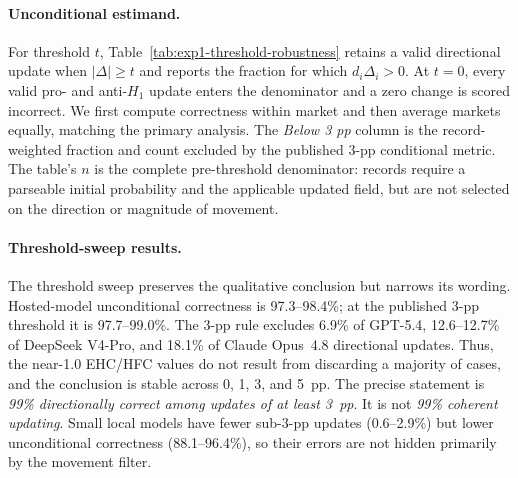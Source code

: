 \paragraph{Unconditional estimand.}
For threshold $t$, Table~\ref{tab:exp1-threshold-robustness} retains a valid
directional update when $|\Delta|\geq t$ and reports the fraction for which
$d_i\Delta_i>0$. At $t=0$, every valid pro- and anti-$H_1$ update enters the
denominator and a zero change is scored incorrect. We first compute correctness
within market and then average markets equally, matching the primary analysis.
The \emph{Below 3 pp} column is the record-weighted fraction and count excluded
by the published 3-pp conditional metric. The table's $n$ is the complete
pre-threshold denominator: records require a parseable initial probability and
the applicable updated field, but are not selected on the direction or magnitude
of movement.

\begin{center}
\begin{minipage}{\linewidth}
\centering
{}
\label{tab:exp1-threshold-robustness}
\scriptsize
\setlength{\tabcolsep}{4pt}
\resizebox{\linewidth}{!}{%

}
\end{minipage}
\end{center}

\paragraph{Threshold-sweep results.}
The threshold sweep preserves the qualitative conclusion but narrows its
wording. Hosted-model unconditional correctness is 97.3--98.4\%; at the
published 3-pp threshold it is 97.7--99.0\%. The 3-pp rule excludes 6.9\% of
GPT-5.4, 12.6--12.7\% of DeepSeek V4-Pro, and 18.1\% of Claude Opus~4.8
directional updates. Thus, the near-1.0 EHC/HFC values do not result from
discarding a majority of cases, and the conclusion is stable across 0, 1, 3,
and 5~pp. The precise statement is \emph{99\% directionally correct among updates
of at least 3~pp}. It is not \emph{99\% coherent updating}. Small local
models have fewer sub-3-pp updates (0.6--2.9\%) but lower unconditional
correctness (88.1--96.4\%), so their errors are not hidden primarily by the
movement filter.

